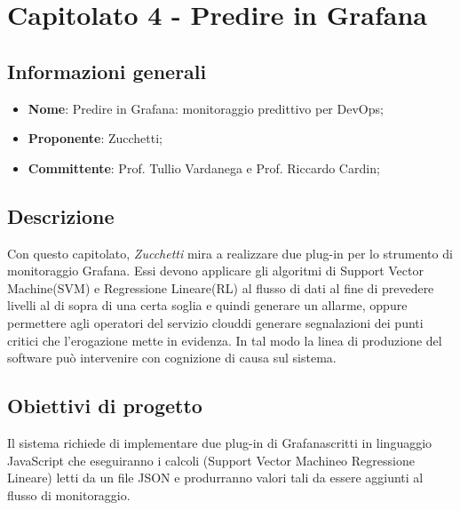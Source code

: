 \section{Capitolato 4 - Predire in Grafana}

\subsection{Informazioni generali}
\begin{itemize}
	\item \textbf{Nome}: Predire in Grafana\glo: monitoraggio predittivo per DevOps\glo;
	\item \textbf{Proponente}: Zucchetti;
	\item \textbf{Committente}: Prof. Tullio Vardanega e Prof. Riccardo Cardin;
\end{itemize}

\subsection{Descrizione}
Con questo capitolato\glo, \textit{Zucchetti} mira a realizzare due plug-in per lo strumento di monitoraggio Grafana\glo. Essi devono applicare gli algoritmi di Support Vector Machine\glosp (SVM) e Regressione Lineare\glosp (RL) al flusso di dati al fine di prevedere livelli al di sopra di una certa soglia e quindi generare un allarme, oppure permettere agli operatori del servizio cloud\glosp di generare segnalazioni dei punti critici che l’erogazione mette in evidenza. In tal modo la linea di produzione del software può intervenire con cognizione di causa sul sistema.

\subsection{Obiettivi di progetto}
Il sistema richiede di implementare due plug-in di Grafana\glosp scritti in linguaggio JavaScript che eseguiranno i calcoli (Support Vector Machine\glosp o Regressione Lineare\glo) letti da un file JSON e produrranno valori tali da essere aggiunti al flusso di monitoraggio.

